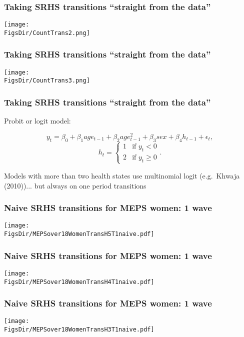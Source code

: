 \documentclass[aspectratio=169]{beamer}
\newcommand{\FigsDir}{../Figures}
\begin{document}
\begin{frame}\frametitle{Taking SRHS transitions ``straight from the data''}
\begin{center}
	\texttt{[image: \\FigsDir/CountTrans2.png]}
\end{center}
\end{frame}


\begin{frame}\frametitle{Taking SRHS transitions ``straight from the data''}
\begin{center}
	\texttt{[image: \\FigsDir/CountTrans3.png]}
\end{center}
\end{frame}


\begin{frame}\frametitle{Taking SRHS transitions ``straight from the data''}
Probit or logit model:

\begin{equation*}
y_{t} = \beta_0 + \beta_1 age_{t-1} + \beta_2 age^2_{t-1} + \beta_3 sex + \beta_4 h_{t-1} + \epsilon_t,
\end{equation*}
\begin{equation*}
h_t = \begin{cases}
1 & \text{if } y_t < 0 \\
2 & \text{if } y_t \geq 0
\end{cases}.
\end{equation*}

Models with more than two health states use multinomial logit (e.g.\ Khwaja (2010))... but always on one period transitions
\end{frame}


\begin{frame}\frametitle{Naive SRHS transitions for MEPS women: 1 wave}
\begin{center}
	\texttt{[image: \\FigsDir/MEPSover18WomenTransH5T1naive.pdf]}
\end{center}
\end{frame}

\begin{frame}\frametitle{Naive SRHS transitions for MEPS women: 1 wave}
\begin{center}
\texttt{[image: \\FigsDir/MEPSover18WomenTransH4T1naive.pdf]}
\end{center}
\end{frame}

\begin{frame}\frametitle{Naive SRHS transitions for MEPS women: 1 wave}
\begin{center}
\texttt{[image: \\FigsDir/MEPSover18WomenTransH3T1naive.pdf]}
\end{center}
\end{frame}
\end{document}
